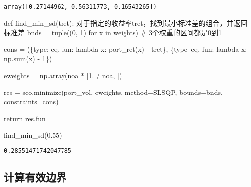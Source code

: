 \documentclass[
  letterpaper,
  DIV=11,
  numbers=noendperiod]{scrreprt}
\newenvironment{Shaded}{\begin{snugshade}}{\end{snugshade}}
\newcommand{\BuiltInTok}[1]{\textcolor[rgb]{0.00,0.23,0.31}{#1}}
\newcommand{\CommentTok}[1]{\textcolor[rgb]{0.37,0.37,0.37}{#1}}
\newcommand{\ControlFlowTok}[1]{\textcolor[rgb]{0.00,0.23,0.31}{#1}}
\newcommand{\DecValTok}[1]{\textcolor[rgb]{0.68,0.00,0.00}{#1}}
\newcommand{\FloatTok}[1]{\textcolor[rgb]{0.68,0.00,0.00}{#1}}
\newcommand{\KeywordTok}[1]{\textcolor[rgb]{0.00,0.23,0.31}{#1}}
\newcommand{\NormalTok}[1]{\textcolor[rgb]{0.00,0.23,0.31}{#1}}
\newcommand{\OperatorTok}[1]{\textcolor[rgb]{0.37,0.37,0.37}{#1}}
\newcommand{\StringTok}[1]{\textcolor[rgb]{0.13,0.47,0.30}{#1}}
\begin{document}
\begin{verbatim}
array([0.27144962, 0.56311773, 0.16543265])
\end{verbatim}

\begin{Shaded}
\begin{Highlighting}[]
\KeywordTok{def}\NormalTok{ find\_min\_sd(tret):}
    \CommentTok{\textquotesingle{}\textquotesingle{}\textquotesingle{}对于指定的收益率tret，找到最小标准差的组合，并返回标准差\textquotesingle{}\textquotesingle{}\textquotesingle{}}
\NormalTok{    bnds }\OperatorTok{=} \BuiltInTok{tuple}\NormalTok{((}\DecValTok{0}\NormalTok{, }\DecValTok{1}\NormalTok{) }\ControlFlowTok{for}\NormalTok{ x }\KeywordTok{in}\NormalTok{ weights)  }\CommentTok{\# 3个权重的区间都是0到1}

\NormalTok{    cons }\OperatorTok{=}\NormalTok{ (\{}\StringTok{\textquotesingle{}type\textquotesingle{}}\NormalTok{: }\StringTok{\textquotesingle{}eq\textquotesingle{}}\NormalTok{, }\StringTok{\textquotesingle{}fun\textquotesingle{}}\NormalTok{: }\KeywordTok{lambda}\NormalTok{ x: port\_ret(x) }\OperatorTok{{-}}\NormalTok{ tret\},}
\NormalTok{            \{}\StringTok{\textquotesingle{}type\textquotesingle{}}\NormalTok{: }\StringTok{\textquotesingle{}eq\textquotesingle{}}\NormalTok{, }\StringTok{\textquotesingle{}fun\textquotesingle{}}\NormalTok{: }\KeywordTok{lambda}\NormalTok{ x: np.}\BuiltInTok{sum}\NormalTok{(x) }\OperatorTok{{-}} \DecValTok{1}\NormalTok{\})}

\NormalTok{    eweights }\OperatorTok{=}\NormalTok{ np.array(noa }\OperatorTok{*}\NormalTok{ [}\FloatTok{1.} \OperatorTok{/}\NormalTok{ noa, ])}

\NormalTok{    res }\OperatorTok{=}\NormalTok{ sco.minimize(port\_vol, eweights, method}\OperatorTok{=}\StringTok{\textquotesingle{}SLSQP\textquotesingle{}}\NormalTok{,}
\NormalTok{                    bounds}\OperatorTok{=}\NormalTok{bnds, constraints}\OperatorTok{=}\NormalTok{cons) }

    \ControlFlowTok{return}\NormalTok{ res.fun}


\NormalTok{find\_min\_sd(}\FloatTok{0.55}\NormalTok{)}
\end{Highlighting}
\end{Shaded}

\begin{verbatim}
0.28551471742047785
\end{verbatim}

\hypertarget{ux8ba1ux7b97ux6709ux6548ux8fb9ux754c}{%
\subsection{计算有效边界}\label{ux8ba1ux7b97ux6709ux6548ux8fb9ux754c}}
\end{document}

